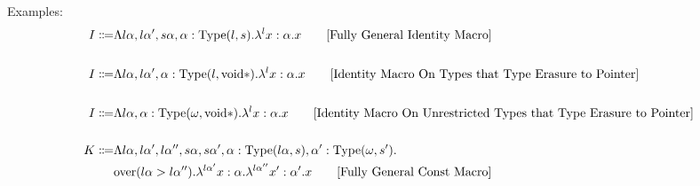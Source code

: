 \documentclass {article}
\begin{document}
Examples:
\begin{align*}
I \Coloneqq & \Lambda l \alpha, l \alpha', s \alpha, \alpha : \text{Type} (l,s). \lambda^l x : \alpha. x \tag* {[Fully General Identity Macro]} \\
\\
I \Coloneqq & \Lambda l \alpha, l \alpha', \alpha : \text{Type} (l,\text{void}*). \lambda^l x : \alpha. x \tag* {[Identity Macro On Types that Type Erasure to Pointer]} \\
\\
I \Coloneqq & \Lambda l \alpha, \alpha : \text{Type} (\omega,\text{void}*). \lambda^l x : \alpha. x \tag* {[Identity Macro On Unrestricted Types that Type Erasure to Pointer]} \\
\\ 
K \Coloneqq & \Lambda l \alpha, l \alpha', l \alpha'', s \alpha, s \alpha', \alpha : \text{Type} (l \alpha, s), \alpha' : \text{Type} (\omega, s'). \\
& \text{over} (l \alpha > l \alpha''). \lambda^{l\alpha'} x : \alpha. \lambda^{l \alpha''} x' : \alpha'. x \tag* {[Fully General Const Macro]}
\end{align*}
\end{document}
